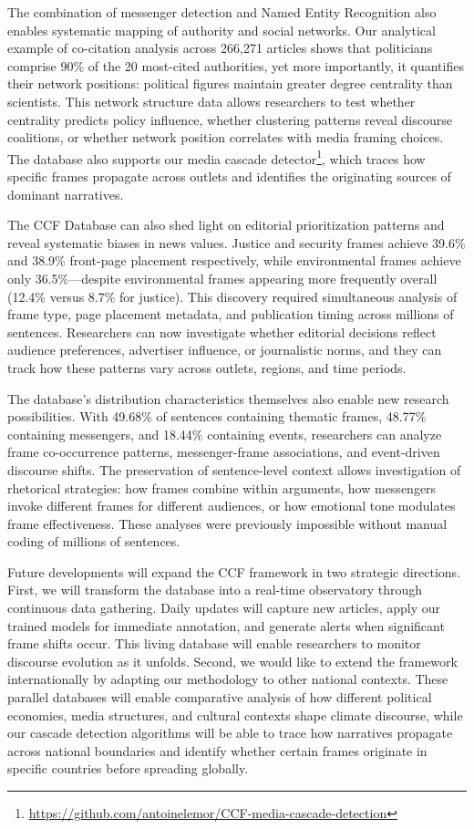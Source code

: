 \documentclass[12pt]{article}
\begin{document}
The combination of messenger detection and Named Entity Recognition also enables systematic mapping of authority and social networks. Our analytical example of co-citation analysis across 266,271 articles shows that politicians comprise 90\% of the 20 most-cited authorities, yet more importantly, it quantifies their network positions: political figures maintain greater degree centrality than scientists. This network structure data allows researchers to test whether centrality predicts policy influence, whether clustering patterns reveal discourse coalitions, or whether network position correlates with media framing choices. The database also supports our media cascade detector\footnote{\url{https://github.com/antoinelemor/CCF-media-cascade-detection}}, which traces how specific frames propagate across outlets and identifies the originating sources of dominant narratives.

The CCF Database can also shed light on editorial prioritization patterns and reveal systematic biases in news values. Justice and security frames achieve 39.6\% and 38.9\% front-page placement respectively, while environmental frames achieve only 36.5\%—despite environmental frames appearing more frequently overall (12.4\% versus 8.7\% for justice). This discovery required simultaneous analysis of frame type, page placement metadata, and publication timing across millions of sentences. Researchers can now investigate whether editorial decisions reflect audience preferences, advertiser influence, or journalistic norms, and they can track how these patterns vary across outlets, regions, and time periods.

The database's distribution characteristics themselves also enable new research possibilities. With 49.68\% of sentences containing thematic frames, 48.77\% containing messengers, and 18.44\% containing events, researchers can analyze frame co-occurrence patterns, messenger-frame associations, and event-driven discourse shifts. The preservation of sentence-level context allows investigation of rhetorical strategies: how frames combine within arguments, how messengers invoke different frames for different audiences, or how emotional tone modulates frame effectiveness. These analyses were previously impossible without manual coding of millions of sentences.

Future developments will expand the CCF framework in two strategic directions. First, we will transform the database into a real-time observatory through continuous data gathering. Daily updates will capture new articles, apply our trained models for immediate annotation, and generate alerts when significant frame shifts occur. This living database will enable researchers to monitor discourse evolution as it unfolds. Second, we would like to extend the framework internationally by adapting our methodology to other national contexts. These parallel databases will enable comparative analysis of how different political economies, media structures, and cultural contexts shape climate discourse, while our cascade detection algorithms will be able to trace how narratives propagate across national boundaries and identify whether certain frames originate in specific countries before spreading globally. 
\end{document}
